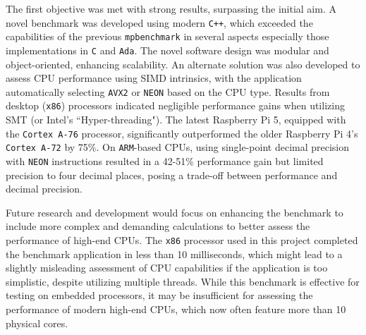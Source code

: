 

The first objective was met with strong results, surpassing the initial aim. A novel benchmark was developed using modern \texttt{C++}, which exceeded the capabilities of the previous \texttt{mpbenchmark}\cite{mpbenchmark_paper} in several aspects especially those implementations in \texttt{C} and \texttt{Ada}. The novel software design was modular and object-oriented, enhancing scalability. An alternate solution was also developed to assess CPU performance using SIMD intrinsics, with the application automatically selecting \texttt{AVX2} or \texttt{NEON} based on the CPU type. Results from desktop (\texttt{x86}) processors indicated negligible performance gains when utilizing SMT (or Intel's ``Hyper-threading"). The latest Raspberry Pi 5, equipped with the \texttt{Cortex A-76} processor, significantly outperformed the older Raspberry Pi 4's \texttt{Cortex A-72} by 75\%. On \texttt{ARM}-based CPUs, using single-point decimal precision with \texttt{NEON} instructions resulted in a 42-51\% performance gain but limited precision to four decimal places, posing a trade-off between performance and decimal precision.

Future research and development would focus on enhancing the benchmark to include more complex and demanding calculations to better assess the performance of high-end CPUs. The \texttt{x86} processor used in this project completed the benchmark application in less than 10 milliseconds, which might lead to a slightly misleading assessment of CPU capabilities if the application is too simplistic, despite utilizing multiple threads. While this benchmark is effective for testing on embedded processors, it may be insufficient for assessing the performance of modern high-end CPUs, which now often feature more than 10 physical cores.

